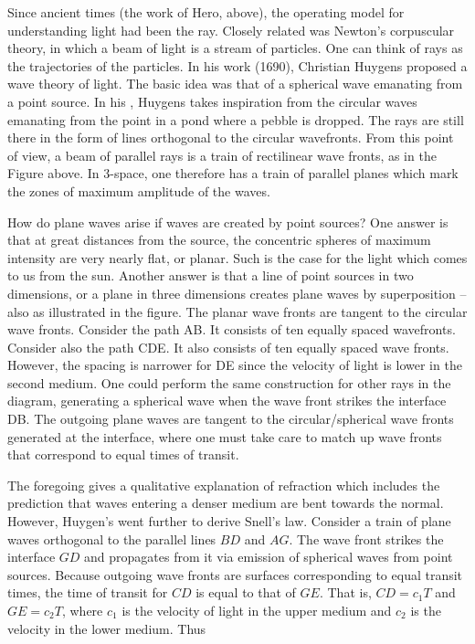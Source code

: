 Since ancient times (the work of Hero, above), the operating model for understanding light had been the ray.  Closely related was Newton's corpuscular theory, in which a beam of light is a stream of particles.  One can think of rays as the trajectories of the particles.
In his work  (1690), Christian Huygens proposed a  wave theory of light. The basic idea was that of a spherical wave emanating from a point source.  In his , Huygens takes inspiration from the circular waves emanating from the point in a pond where a pebble is dropped.  The rays are still there in the form of lines orthogonal to the circular wavefronts.  From this point of view, a beam of parallel rays is a train of rectilinear wave fronts, as in the Figure above.  In 3-space, one therefore has a train of parallel planes which mark the zones of maximum amplitude of the waves.

How do plane waves arise if waves are created by point sources?  One answer is that at great distances from the source, the concentric spheres of maximum intensity are very nearly flat, or planar. Such is the case for the light which comes to us from the sun.  Another answer is that a line of point sources in two dimensions, or a plane in three dimensions creates plane waves by superposition -- also as illustrated in the figure. The planar wave fronts are tangent to the circular wave fronts.  Consider the path AB. It consists of ten equally spaced wavefronts.  Consider also the path CDE. It also consists of ten equally spaced wave fronts. However, the spacing is narrower for DE since the velocity of light is lower in the second medium.  One could perform the same construction for other rays in the diagram, generating a spherical wave when the wave front strikes the interface DB. The outgoing plane waves are tangent to the circular/spherical wave fronts generated at the interface, where one must take care to match up wave fronts that correspond to equal times of transit.


 The foregoing gives a qualitative explanation of refraction which includes the prediction that waves entering a denser medium are bent towards the normal. However, Huygen's went further to derive Snell's law.  Consider a train of plane waves orthogonal to the parallel lines $BD$ and $AG$.  The wave front strikes the interface $GD$ and propagates from it via emission of spherical waves from point sources.  Because outgoing wave fronts are surfaces corresponding to equal transit times, the time of transit for $CD$ is equal to that of $GE$.  That is, $CD= c_1T$ and $GE = c_2T$, where $c_1$ is the velocity of light in the upper medium and $c_2$ is the velocity in the lower medium.  Thus

